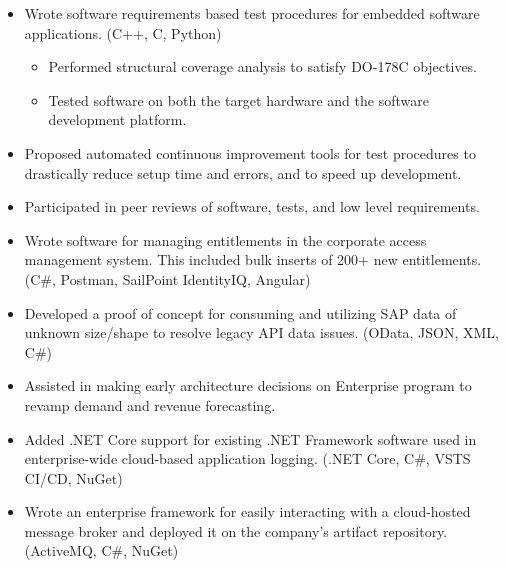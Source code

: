 \documentclass[10pt,letterpaper,sans]{moderncv}   %
\begin{document}
{ {}
\begin{itemize}
    \item Wrote software requirements based test procedures for embedded software applications. (C++, C, Python)
    \begin{itemize}
        \item Performed structural coverage analysis to satisfy DO-178C objectives.
        \item Tested software on both the target hardware and the software development platform.
    \end{itemize}
    \item Proposed automated continuous improvement tools for test procedures to drastically reduce setup time and errors, and to speed up development.
    \item Participated in peer reviews of software, tests, and low level requirements.
\end{itemize}}

{ {}
\begin{itemize}
    \item Wrote software for managing entitlements in the corporate access management system. This included bulk inserts of 200+ new entitlements. (C\#, Postman, SailPoint IdentityIQ, Angular)
    \item Developed a proof of concept for consuming and utilizing SAP data of unknown size/shape to resolve legacy API data issues. (OData, JSON, XML, C\#)
    \item Assisted in making early architecture decisions on Enterprise program to revamp demand and revenue forecasting.
    \item Added .NET Core support for existing .NET Framework software used in enterprise-wide cloud-based application logging. (.NET Core, C\#, VSTS CI/CD, NuGet)
    \item Wrote an enterprise framework for easily interacting with a cloud-hosted message broker and deployed it on the company’s artifact repository. (ActiveMQ, C\#, NuGet)
\end{itemize}}
\end{document}
